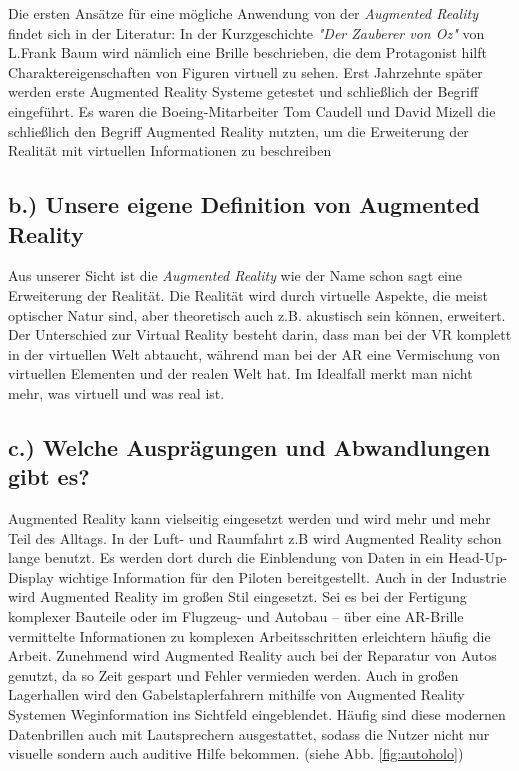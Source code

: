 \documentclass[12pt,utf8]{scrartcl}
\begin{document}
\begin{flushleft}
Die ersten Ansätze für eine mögliche Anwendung von der \textit{Augmented Reality} findet sich in der Literatur: In der Kurzgeschichte \textit{"Der Zauberer von Oz"} von L.Frank Baum wird nämlich eine Brille beschrieben, die dem Protagonist hilft Charaktereigenschaften von Figuren virtuell zu sehen\cite{onlineAR}. Erst Jahrzehnte später werden erste Augmented Reality Systeme getestet und schließlich der Begriff eingeführt. Es waren die Boeing-Mitarbeiter Tom Caudell und David Mizell die schließlich den Begriff Augmented Reality nutzten, um die Erweiterung der Realität mit virtuellen Informationen zu beschreiben\cite{TomDavid.}


\subsection*{\label{sub2:thema}b.) Unsere eigene Definition von Augmented Reality}

Aus unserer Sicht ist die \textit{Augmented Reality} wie der Name schon sagt eine Erweiterung der Realität. Die Realität wird durch virtuelle Aspekte, die meist optischer Natur sind, aber theoretisch auch z.B. akustisch sein können, erweitert. Der Unterschied zur Virtual Reality besteht darin, dass man bei der VR komplett in der virtuellen Welt abtaucht, während man bei der AR eine Vermischung von virtuellen Elementen und der realen Welt hat. Im Idealfall merkt man nicht mehr, was virtuell und was real ist. 

\subsection*{\label{sub3:thema}c.) Welche Ausprägungen und Abwandlungen gibt es?}

Augmented Reality kann vielseitig eingesetzt werden und wird mehr und mehr Teil des Alltags. In der Luft- und Raumfahrt z.B wird Augmented Reality schon lange benutzt. Es werden dort durch die Einblendung von Daten in ein Head-Up-Display wichtige Information für den Piloten bereitgestellt. Auch in der Industrie wird Augmented Reality im großen Stil eingesetzt. Sei es bei der Fertigung komplexer Bauteile oder im Flugzeug- und Autobau – über eine AR-Brille vermittelte Informationen zu komplexen Arbeitsschritten erleichtern häufig die Arbeit. Zunehmend wird Augmented Reality auch bei der Reparatur von Autos genutzt, da so Zeit gespart und Fehler vermieden werden. Auch in großen Lagerhallen wird den Gabelstaplerfahrern mithilfe von Augmented Reality Systemen Weginformation ins Sichtfeld eingeblendet. Häufig sind diese modernen Datenbrillen auch mit Lautsprechern ausgestattet, sodass die Nutzer nicht nur visuelle sondern auch auditive Hilfe bekommen. (siehe Abb. \ref{fig:autoholo})
\linebreak


\end{flushleft}
\end{document}
